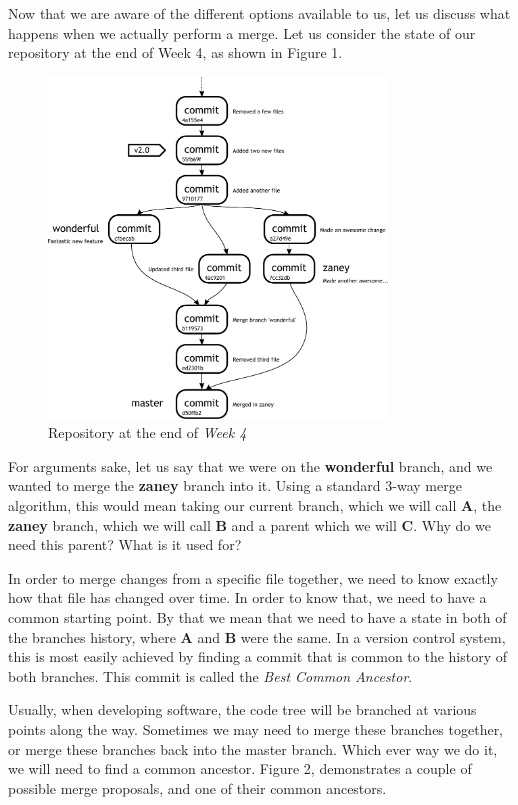 Now that we are aware of the different options available to us, let us discuss what happens when we actually perform a merge.  Let us consider the state of our repository at the end of Week 4, as shown in Figure 1.

\begin{figure}[hbt]
\centering
\includegraphics[width=9cm]{images/f-w4-d6.pdf}
\caption{Repository at the end of \emph{Week 4}}
\end{figure}

For arguments sake, let us say that we were on the \textbf{wonderful} branch, and we wanted to merge the \textbf{zaney} branch into it.  Using a standard 3-way merge algorithm, this would mean taking our current branch, which we will call \textbf{A}, the \textbf{zaney} branch, which we will call \textbf{B} and a parent which we will \textbf{C}.  Why do we need this parent?  What is it used for?

In order to merge changes from a specific file together, we need to know exactly how that file has changed over time.  In order to know that, we need to have a common starting point.  By that we mean that we need to have a state in both of the branches history, where \textbf{A} and \textbf{B} were the same.  In a version control system, this is most easily achieved by finding a commit that is common to the history of both branches.  This commit is called the \emph{Best Common Ancestor}.

Usually, when developing software, the code tree will be branched at various points along the way.  Sometimes we may need to merge these branches together, or merge these branches back into the master branch.  Which ever way we do it, we will need to find a common ancestor.  Figure 2, demonstrates a couple of possible merge proposals, and one of their common ancestors.

